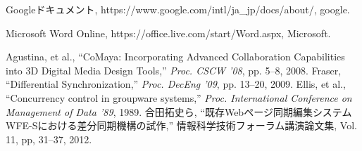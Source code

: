 \renewcommand{\bibname}{参考文献}
\begin{thebibliography}{Longest9}
Googleドキュメント, https://www.google.com/intl/ja_jp/docs/about/, google.

Microsoft Word Online, https://office.live.com/start/Word.aspx, Microsoft.

Agustina, et al., ``CoMaya: Incorporating Advanced Collaboration Capabilities into 3D Digital Media Design Tools,'' {\it Proc. CSCW '08}, pp. 5--8, 2008.
Fraser,	``Differential Synchronization,''  {\it Proc. DecEng '09}, pp. 13--20, 2009.
Ellis, et al., ``Concurrency control in groupware systems,'' {\it Proc. International Conference on Management of Data '89}, 1989.
合田拓史ら, ``既存Webページ同期編集システムWFE-Sにおける差分同期機構の試作,'' 情報科学技術フォーラム講演論文集, Vol. 11, pp, 31--37, 2012.
\end{thebibliography}
